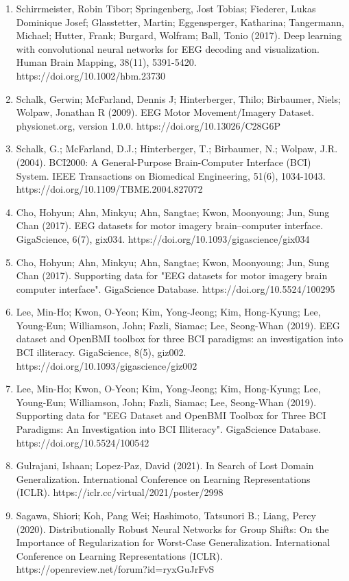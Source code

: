 \documentclass[11pt]{article}
\begin{document}
\begin{enumerate}
\item Schirrmeister, Robin Tibor; Springenberg, Jost Tobias; Fiederer, Lukas Dominique Josef; Glasstetter, Martin; Eggensperger, Katharina; Tangermann, Michael; Hutter, Frank; Burgard, Wolfram; Ball, Tonio (2017). Deep learning with convolutional neural networks for EEG decoding and visualization. Human Brain Mapping, 38(11), 5391-5420. https://doi.org/10.1002/hbm.23730
\item Schalk, Gerwin; McFarland, Dennis J; Hinterberger, Thilo; Birbaumer, Niels; Wolpaw, Jonathan R (2009). EEG Motor Movement/Imagery Dataset. physionet.org, version 1.0.0. https://doi.org/10.13026/C28G6P
\item Schalk, G.; McFarland, D.J.; Hinterberger, T.; Birbaumer, N.; Wolpaw, J.R. (2004). BCI2000: A General-Purpose Brain-Computer Interface (BCI) System. IEEE Transactions on Biomedical Engineering, 51(6), 1034-1043. https://doi.org/10.1109/TBME.2004.827072
\item Cho, Hohyun; Ahn, Minkyu; Ahn, Sangtae; Kwon, Moonyoung; Jun, Sung Chan (2017). EEG datasets for motor imagery brain--computer interface. GigaScience, 6(7), gix034. https://doi.org/10.1093/gigascience/gix034
\item Cho, Hohyun; Ahn, Minkyu; Ahn, Sangtae; Kwon, Moonyoung; Jun, Sung Chan (2017). Supporting data for "EEG datasets for motor imagery brain computer interface". GigaScience Database. https://doi.org/10.5524/100295
\item Lee, Min-Ho; Kwon, O-Yeon; Kim, Yong-Jeong; Kim, Hong-Kyung; Lee, Young-Eun; Williamson, John; Fazli, Siamac; Lee, Seong-Whan (2019). EEG dataset and OpenBMI toolbox for three BCI paradigms: an investigation into BCI illiteracy. GigaScience, 8(5), giz002. https://doi.org/10.1093/gigascience/giz002
\item Lee, Min-Ho; Kwon, O-Yeon; Kim, Yong-Jeong; Kim, Hong-Kyung; Lee, Young-Eun; Williamson, John; Fazli, Siamac; Lee, Seong-Whan (2019). Supporting data for "EEG Dataset and OpenBMI Toolbox for Three BCI Paradigms: An Investigation into BCI Illiteracy". GigaScience Database. https://doi.org/10.5524/100542
\item Gulrajani, Ishaan; Lopez-Paz, David (2021). In Search of Lost Domain Generalization. International Conference on Learning Representations (ICLR). https://iclr.cc/virtual/2021/poster/2998
\item Sagawa, Shiori; Koh, Pang Wei; Hashimoto, Tatsunori B.; Liang, Percy (2020). Distributionally Robust Neural Networks for Group Shifts: On the Importance of Regularization for Worst-Case Generalization. International Conference on Learning Representations (ICLR). https://openreview.net/forum?id=ryxGuJrFvS

\end{enumerate}
\end{document}

